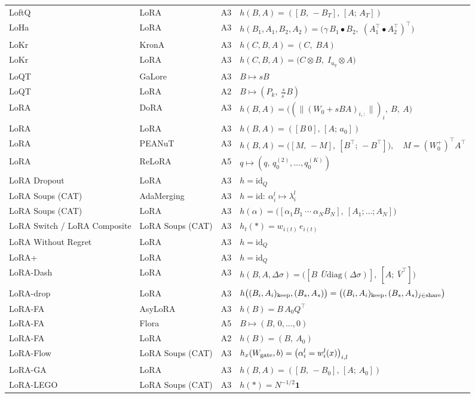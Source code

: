 \begin{longtable}{@{}>{\raggedright\arraybackslash}p{2.4cm}>{\raggedright\arraybackslash}p{2.4cm}c>{\raggedright\arraybackslash}p{8.6cm}@{}}
LoftQ & LoRA & A3 & $h(B,A)=([B,\,-B_T],\,[A;\,A_T])$\\
LoHa & LoRA & A3 & $h(B_1,A_1,B_2,A_2)=\big(\gamma\,B_1\bullet B_2,\;(A_1^\top\bullet A_2^\top)^\top\big)$\\
LoKr & KronA & A3 & $h(C,B,A)=(C,\;BA)$\\
LoKr & LoRA & A3 & $h(C,B,A)=\big(C\otimes B,\;I_{u_q}\otimes A\big)$\\
LoQT & GaLore & A3 & $B\mapsto sB$\\
LoQT & LoRA & A2 & $B\mapsto(P_k,\ \tfrac{s}{s^\prime}B)$\\
LoRA & DoRA & A3 & $h(B,A)=\big((\lVert(W_0+sBA)_{i,:}\rVert)_i,\ B,\ A\big)$\\
LoRA & LoRA & A3 & $h(B,A)=([B\ 0],\,[A;\,a_0])$\\
LoRA & PEANuT & A3 & $h(B,A)=\big([M,\,-M],\ [B^\top;\,-B^\top]\big),\quad M=(W_0^{+})^\top A^\top$\\
LoRA & ReLoRA & A5 & $q\mapsto(q,\,q_0^{(2)},\dots,q_0^{(K)})$\\
LoRA Dropout & LoRA & A3 & $h=\mathrm{id}_Q$\\
LoRA Soups (CAT) & AdaMerging & A3 & $h=\mathrm{id}:\ \alpha_i^{l}\mapsto\lambda_i^{l}$\\
LoRA Soups (CAT) & LoRA & A3 & $h(\alpha)=\big([\alpha_1B_1\ \cdots\ \alpha_NB_N],\ [A_1;\dots;A_N]\big)$\\
LoRA Switch / LoRA Composite & LoRA Soups (CAT) & A3 & $h_t(\ast)=w_{i(t)}\,e_{i(t)}$\\
LoRA Without Regret & LoRA & A3 & $h=\mathrm{id}_Q$\\
LoRA+ & LoRA & A3 & $h=\mathrm{id}_Q$\\
LoRA-Dash & LoRA & A3 & $h(B,A,\Delta\sigma)=\big([B\ \ \bar U\mathrm{diag}(\Delta\sigma)],\ [A;\ \bar V^\top]\big)$\\
LoRA-drop & LoRA & A3 & $h\big((B_i,A_i)_{\rm keep},(B_s,A_s)\big)=\big((B_i,A_i)_{\rm keep},(B_s,A_s)_{j\in\rm share}\big)$\\
LoRA-FA & AsyLoRA & A3 & $h(B)=B\,A_0Q^\top$\\
LoRA-FA & Flora & A5 & $B\mapsto(B,\,0,\dots,0)$\\
LoRA-FA & LoRA & A2 & $h(B)=(B,\ A_0)$\\
LoRA-Flow & LoRA Soups (CAT) & A3 & $h_x(W_{\rm gate},b)=\big(\alpha_i^{l}=w_i^{l}(x)\big)_{i,l}$\\
LoRA-GA & LoRA & A3 & $h(B,A)=([B,\,-B_0],\,[A;\,A_0])$\\
LoRA-LEGO & LoRA Soups (CAT) & A3 & $h(\ast)=N^{-1/2}\mathbf 1$\\

\end{longtable}
